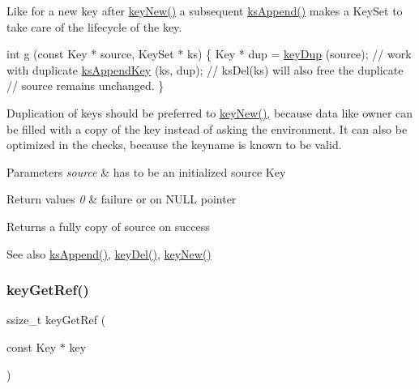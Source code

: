 Like for a new key after \hyperlink{group__key_gad23c65b44bf48d773759e1f9a4d43b89}{key\+New()} a subsequent \hyperlink{group__keyset_ga21eb9c3a14a604ee3a8bdc779232e7b7}{ks\+Append()} makes a Key\+Set to take care of the lifecycle of the key.


\begin{DoxyCode}
\textcolor{keywordtype}{int} g (\textcolor{keyword}{const} Key * source, KeySet * ks)
\{
        Key * dup = \hyperlink{group__key_gae6ec6a60cc4b8c1463fa08623d056ce3}{keyDup} (source);
        \textcolor{comment}{// work with duplicate}
        \hyperlink{group__keyset_gaa5a1d467a4d71041edce68ea7748ce45}{ksAppendKey} (ks, dup);
        \textcolor{comment}{// ksDel(ks) will also free the duplicate}
        \textcolor{comment}{// source remains unchanged.}
\}
\end{DoxyCode}


Duplication of keys should be preferred to \hyperlink{group__key_gad23c65b44bf48d773759e1f9a4d43b89}{key\+New()}, because data like owner can be filled with a copy of the key instead of asking the environment. It can also be optimized in the checks, because the keyname is known to be valid.


\begin{DoxyParams}{Parameters}
{\em source} & has to be an initialized source Key \\
\hline
\end{DoxyParams}

\begin{DoxyRetVals}{Return values}
{\em 0} & failure or on N\+U\+LL pointer \\
\hline
\end{DoxyRetVals}
\begin{DoxyReturn}{Returns}
a fully copy of source on success 
\end{DoxyReturn}
\begin{DoxySeeAlso}{See also}
\hyperlink{group__keyset_ga21eb9c3a14a604ee3a8bdc779232e7b7}{ks\+Append()}, \hyperlink{group__key_ga3df95bbc2494e3e6703ece5639be5bb1}{key\+Del()}, \hyperlink{group__key_gad23c65b44bf48d773759e1f9a4d43b89}{key\+New()} 
\end{DoxySeeAlso}
\mbox{\label{group__key_ga4aabc4272506dd63161db2bbb42de8ae}} 
\subsubsection{\texorpdfstring{key\+Get\+Ref()}{keyGetRef()}}
{\footnotesize\ttfamily ssize\+\_\+t key\+Get\+Ref (\begin{DoxyParamCaption}\item[{const Key $\ast$}]{key }\end{DoxyParamCaption})}



